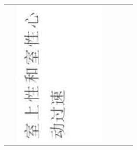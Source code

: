 \documentclass[10pt]{article}
\begin{document}
\begin{center}
\begin{tabular}{|c|c|c|c|c|c|}
 & \includegraphics[max width=\textwidth]{2024_07_05_645bb794a4d4f32ee0c8g-352(3)}

\end{tabular}
\end{center}
\end{document}
